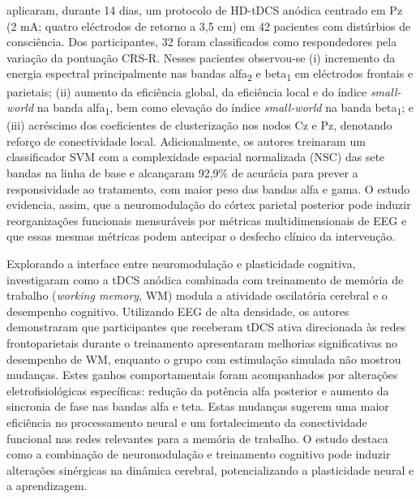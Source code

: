  aplicaram, durante 14 dias, um protocolo de HD-tDCS anódica centrado em Pz (2 mA; quatro eléctrodos de retorno a 3{,}5 cm) em 42 pacientes com distúrbios de consciência. Dos participantes, 32 foram classificados como respondedores pela variação da pontuação CRS-R. Nesses pacientes observou-se (i) incremento da energia espectral principalmente nas bandas alfa\textsubscript{2} e beta\textsubscript{1} em eléctrodos frontais e parietais; (ii) aumento da eficiência global, da eficiência local e do índice \textit{small-world} na banda alfa\textsubscript{1}, bem como elevação do índice \textit{small-world} na banda beta\textsubscript{1}; e (iii) acréscimo dos coeficientes de clusterização nos nodos Cz e Pz, denotando reforço de conectividade local. Adicionalmente, os autores treinaram um classificador SVM com a complexidade espacial normalizada (NSC) das sete bandas na linha de base e alcançaram 92{,}9\% de acurácia para prever a responsividade ao tratamento, com maior peso das bandas alfa e gama. O estudo evidencia, assim, que a neuromodulação do córtex parietal posterior pode induzir reorganizações funcionais mensuráveis por métricas multidimensionais de EEG e que essas mesmas métricas podem antecipar o desfecho clínico da intervenção.

Explorando a interface entre neuromodulação e plasticidade cognitiva,  investigaram como a tDCS anódica combinada com treinamento de memória de trabalho (\textit{working memory}, WM) modula a atividade oscilatória cerebral e o desempenho cognitivo. Utilizando EEG de alta densidade, os autores demonstraram que participantes que receberam tDCS ativa direcionada às redes frontoparietais durante o treinamento apresentaram melhorias significativas no desempenho de WM, enquanto o grupo com estimulação simulada não mostrou mudanças. Estes ganhos comportamentais foram acompanhados por alterações eletrofisiológicas específicas: redução da potência alfa posterior e aumento da sincronia de fase nas bandas alfa e teta. Estas mudanças sugerem uma maior eficiência no processamento neural e um fortalecimento da conectividade funcional nas redes relevantes para a memória de trabalho. O estudo destaca como a combinação de neuromodulação e treinamento cognitivo pode induzir alterações sinérgicas na dinâmica cerebral, potencializando a plasticidade neural e a aprendizagem.

